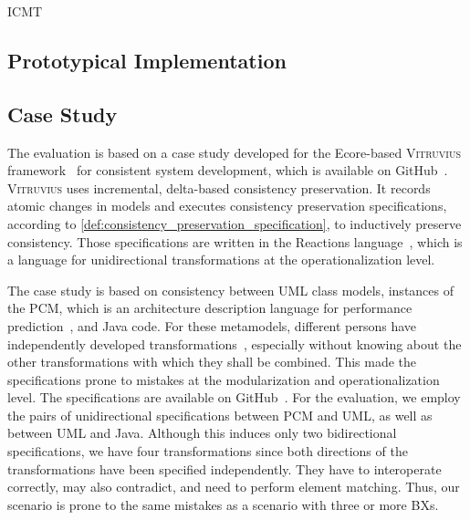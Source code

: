 \begin{copiedFrom}{ICMT}
\subsection{Prototypical Implementation}


\subsection{Case Study}
The evaluation is based on a case study developed for the Ecore-based \textsc{Vitruvius} framework~\cite{kramer2013b} for consistent system development, which is available on GitHub~\cite{vitruvFrameworkGithub}.
\textsc{Vitruvius} uses incremental, delta-based consistency preservation. 
It records atomic changes in models and executes consistency preservation specifications, according to \autoref{def:consistency_preservation_specification}, to inductively preserve consistency.
Those specifications are written in the Reactions language~\cite{klare2016b}, which is a language for unidirectional transformations at the operationalization level.

The case study is based on consistency between UML class models, instances of the \ac{PCM}, which is an architecture description language for performance prediction~\cite{reussner2016b}, and Java code.
For these metamodels, different persons have independently developed transformations~\cite{kramer2017a}, especially without knowing about the other transformations with which they shall be combined.
This made the specifications prone to mistakes at the modularization and operationalization level.
The specifications are available on GitHub~\cite{vitruvCBSEGithub}.
For the evaluation, we employ the pairs of unidirectional specifications between \ac{PCM} and UML, as well as between UML and Java.
Although this induces only two bidirectional specifications, we have four transformations since both directions of the transformations have been specified independently.
They have to interoperate correctly, may also contradict, and need to perform element matching.
Thus, our scenario is prone to the same mistakes as a scenario with three or more \acp{BX}.


\end{copiedFrom}

